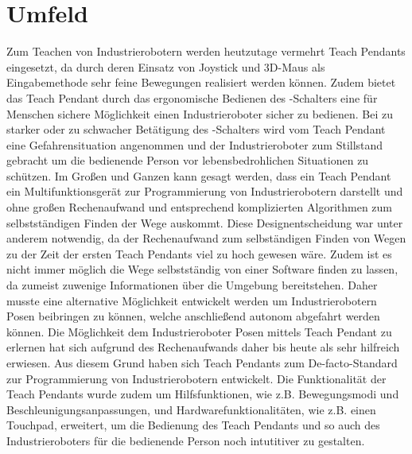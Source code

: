 \section{Umfeld}
Zum Teachen von Industrierobotern werden heutzutage vermehrt Teach Pendants eingesetzt, da durch deren Einsatz von Joystick und 3D-Maus als Eingabemethode sehr feine Bewegungen realisiert werden können. Zudem bietet das Teach Pendant durch das ergonomische Bedienen des -Schalters eine für Menschen sichere Möglichkeit einen Industrieroboter sicher zu bedienen. Bei zu starker oder zu schwacher Betätigung des -Schalters wird vom Teach Pendant eine Gefahrensituation angenommen und der Industrieroboter zum Stillstand gebracht um die bedienende Person vor lebensbedrohlichen Situationen zu schützen. Im Großen und Ganzen kann gesagt werden, dass ein Teach Pendant ein Multifunktionsgerät zur Programmierung von Industrierobotern darstellt und ohne großen Rechenaufwand und entsprechend komplizierten Algorithmen zum selbstständigen Finden der Wege auskommt. Diese Designentscheidung war unter anderem notwendig, da der Rechenaufwand zum selbständigen Finden von Wegen zu der Zeit der ersten Teach Pendants viel zu hoch gewesen wäre. Zudem ist es nicht immer möglich die Wege selbstständig von einer Software finden zu lassen, da zumeist zuwenige Informationen über die Umgebung bereitstehen. Daher musste eine alternative Möglichkeit entwickelt werden um Industrierobotern Posen beibringen zu können, welche anschließend autonom abgefahrt werden können. Die Möglichkeit dem Industrieroboter Posen mittels Teach Pendant zu erlernen hat sich aufgrund des Rechenaufwands daher bis heute als sehr hilfreich erwiesen. Aus diesem Grund haben sich Teach Pendants zum De-facto-Standard zur Programmierung von Industrierobotern entwickelt. Die Funktionalität der Teach Pendants wurde zudem um Hilfsfunktionen, wie z.B. Bewegungsmodi und Beschleunigungsanpassungen, und Hardwarefunktionalitäten, wie z.B. einen Touchpad, erweitert, um die Bedienung des Teach Pendants und so auch des Industrieroboters für die bedienende Person noch intutitiver zu gestalten.

